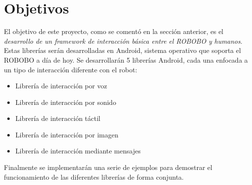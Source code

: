  \section{Objetivos}
 \label{sec:intro-objetives}
 El objetivo de este proyecto, como se comentó en la sección anterior, es el \textit{desarrollo de un framework de interacción básica entre el ROBOBO y humanos}. Estas librerías serán desarrolladas en Android, sistema operativo que soporta el ROBOBO a día de hoy. Se desarrollarán 5 librerías Android, cada una enfocada a un tipo de interacción diferente con el robot:
 \begin{itemize}
 	\item Librería de interacción por voz
 	\item Librería de interacción por sonido
 	\item Librería de interacción táctil
 	\item Librería de interacción por imagen
 	\item Librería de interacción mediante mensajes
 \end{itemize} 
 Finalmente se implementarán una serie de ejemplos para demostrar el funcionamiento de las diferentes librerías de forma conjunta.
